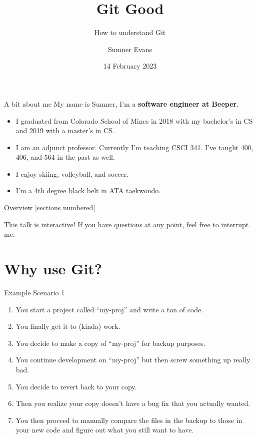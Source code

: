 \documentclass{beeper}
\title{Git Good}
\subtitle{How to understand Git}
\author{Sumner Evans}
\institute{Mines ACM}
\date{14 February 2023}
\begin{document}
\begin{frame}{A bit about me}
    My name is Sumner, I'm a \textbf{software engineer at Beeper}.
    \begin{itemize}
        \item I graduated from Colorado School of Mines in 2018 with my
            bachelor's in CS and 2019 with a master's in CS.
        \item I am an adjunct professor. Currently I'm teaching CSCI 341. I've
            taught 400, 406, and 564 in the past as well.
        \item I enjoy skiing, volleyball, and soccer.
        \item I'm a 4th degree black belt in ATA taekwondo.
    \end{itemize}
\end{frame}

\begin{frame}{Overview}
    [sections numbered]
    \tableofcontents[hideallsubsections]

    \begin{block}{This talk is interactive!}
        If you have questions at any point, feel free to interrupt me.
    \end{block}
\end{frame}

\section{Why use Git?}

\begin{frame}{Example Scenario 1}

    \begin{enumerate}[<+->]
        \item You start a project called ``my-proj'' and write a ton of code.
        \item You finally get it to (kinda) work.
        \item You decide to make a copy of ``my-proj'' for backup purposes.
        \item You continue development on ``my-proj'' but then screw something
            up really bad.
        \item You decide to revert back to your copy.
        \item Then you realize your copy doesn't have a bug fix that you
            actually wanted.
        \item You then proceed to manually compare the files in the backup to
            those in your new code and figure out what you still want to have.
    \end{enumerate}

\end{frame}
\end{document}

